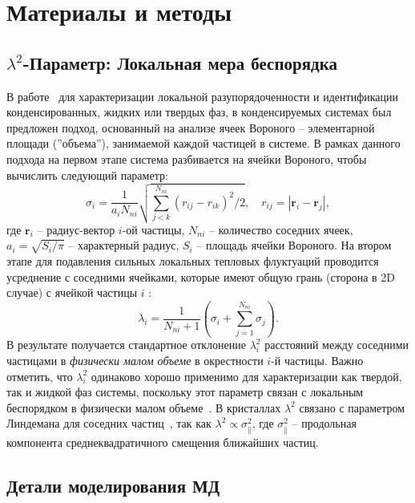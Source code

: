 \section{Материалы и методы}

\subsection{$\lambda^2$-Параметр: Локальная мера беспорядка}
\label{SSMF-AppA}

В работе~\cite{10.1021/acs.jpcc.7b09317} для характеризации локальной разупорядоченности и идентификации конденсированных, жидких или твердых фаз, в конденсируемых системах был предложен подход, основанный на анализе ячеек Вороного -- элементарной площади (''объема''), занимаемой каждой частицей в системе.
В рамках данного подхода на первом этапе система разбивается на ячейки Вороного, чтобы вычислить следующий параметр:
\begin{equation}
  \label{SSMF-eq1}
  \sigma_{i} =\frac{1}{a_i N_{ni}}\sqrt{\sum_{j<k}^{N_{ni}}{(r_{ij}-r_{ik})^2}/2}, \quad r_{ij}=|\mathbf{r}_i-\mathbf{r}_j|,
\end{equation}
где $\mathbf{r}_i$ -- радиус-вектор $i$-ой частицы, $N_{ni}$ -- количество соседних ячеек, $a_i = \sqrt{S_i/\pi}$ -- характерный радиус, $S_i$ -- площадь ячейки Вороного.
На втором этапе для подавления сильных локальных тепловых флуктуаций проводится усреднение с соседними ячейками, которые имеют общую грань (сторона в 2D случае) с ячейкой частицы $i$ \cite{10.1021/acs.jpcc.7b09317}:
\begin{equation}
  \label{SSMF-eq2}
  \lambda_{i} = \frac{1}{N_{ni}+1}\left(\sigma_{i}+\sum_{j=1}^{N_{ni}}{\sigma_{j}}\right).
\end{equation}
В результате получается стандартное отклонение $\lambda_i^2$ расстояний между соседними частицами в \emph{физически малом объеме} в окрестности $i$-й частицы.
Важно отметить, что $\lambda_i^2$ одинаково хорошо применимо для характеризации как твердой, так и жидкой фаз системы, поскольку этот параметр связан с локальным беспорядком в физически малом объеме~\cite{10.1021/acs.jpcc.7b09317}.
В кристаллах $\lambda^2$ связано с параметром Линдемана для соседних частиц~\cite{10.1016/0375-9601(85)90617-6}, так как $\lambda^2 \propto \sigma_\|^2$, где $\sigma_\|^2$ -- продольная компонента среднеквадратичного смещения ближайших частиц.


\subsection{Детали моделирования МД}
\label{SSMF-AppC}

